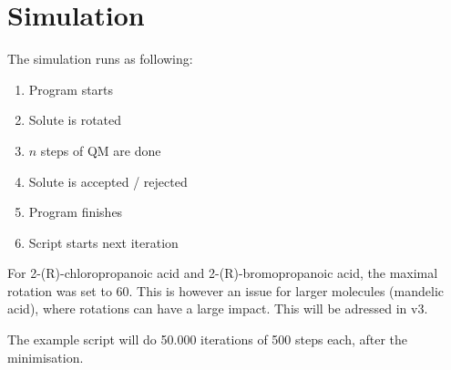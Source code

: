 \documentclass[a4paper,fleqn]{report}
\begin{document}
	\section{Simulation}
	The simulation runs as following:
	\begin{enumerate}
		\setlength{\itemsep}{-1pt}
		\setlength{\parsep}{-1pt}
		\item Program starts
		\item Solute is rotated
		\item $n$ steps of QM are done
		\item Solute is accepted / rejected
		\item Program finishes
		\item Script starts next iteration
	\end{enumerate}
	
	For 2-(R)-chloropropanoic acid and 2-(R)-bromopropanoic acid, the maximal 
	rotation was set to 60\textdegree.
	This is however an issue for larger molecules (mandelic acid), where 
	rotations can have a large impact. This will be adressed in v3.
	
	The example script will do 50.000 iterations of 500 steps each, after the 
	minimisation.
	

	\newpage
	\begin{spacing}{0.75}
		\label{Referenties}
		\clearpage
		\renewcommand{\bibname}{Referenties}
		
	\end{spacing}
	
	
\end{document}
